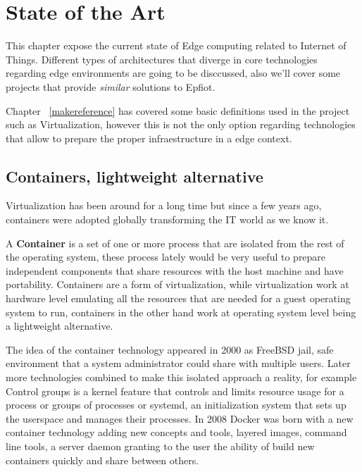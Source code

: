 
\cleardoublepage


\chapter{State of the Art}
\label{makereference2}

This chapter expose the current state of Edge computing related to Internet of Things. Different types of architectures that diverge in core technologies regarding edge environments are going to be disccussed,  also we'll cover some projects that provide \textit{similar} solutions to Epfiot.

Chapter ~\ref{makereference} has covered some basic definitions used in the project such as Virtualization, however this is not the only option regarding technologies that allow to prepare the proper infraestructure in a edge context.

\section{Containers, lightweight alternative}
\label{makereference2.1}

Virtualization has been around for a long time but since a few years ago, containers were adopted globally transforming the IT world
as we know it.

A \textbf{Container} is a set of one or more process that are isolated from the rest of the operating system, these process lately would be very useful to prepare independent components that share resources with the host machine and have portability. 
Containers are a form of virtualization, while virtualization work at hardware level emulating all the resources that are needed for a guest operating system to run, containers in the other hand work at operating system level being a lightweight alternative.

The idea of the container technology appeared in 2000 as FreeBSD jail, safe environment that a system administrator could share with multiple users. Later more technologies combined to make this isolated approach a reality, for example Control groups is a kernel feature that controls and limits resource usage for a process or groups of processes or systemd, an initialization system that sets up the userspace and manages their processes. In 2008 Docker was born with a new container technology adding new concepts and tools, layered images, command line tools, a server daemon granting to the user the ability of build new containers quickly and share between others.~\cite{redhat_container}

